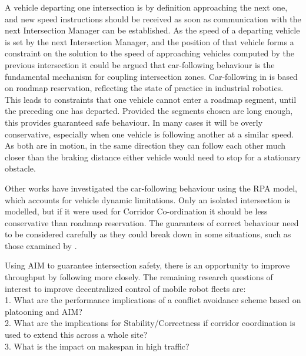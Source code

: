 \documentclass[runningheads]{llncs}
\begin{document}
A vehicle departing one intersection is by definition approaching the next one, and new speed instructions should be received as soon as communication with the next Intersection Manager can be established. As the speed of a departing vehicle is set by the next Intersection Manager, and the position of that vehicle forms a constraint on the solution to the speed of approaching vehicles computed by the previous intersection it could be argued that car-following behaviour is the fundamental mechanism for coupling intersection zones. Car-following in \cite{Digani2019} is based on roadmap reservation, reflecting the state of practice in industrial robotics. This leads to constraints that one vehicle cannot enter a roadmap segment, until the preceding one has departed. Provided the segments chosen are long enough, this provides guaranteed safe behaviour. In many cases it will be overly conservative, especially when one vehicle is following another at a similar speed. As both are in motion, in the same direction they can follow each other much closer than the braking distance either vehicle would need to stop for a stationary obstacle.

Other works have investigated the car-following behaviour \cite{Bichiou2019} using the RPA model, which accounts for vehicle dynamic limitations. Only an isolated intersection is modelled, but if it were used for Corridor Co-ordination it should be less conservative than roadmap reservation. The guarantees of correct behaviour need to be considered carefully as they could break down in some situations, such as those examined by \cite{Du2020}.


Using AIM to guarantee intersection safety, there is an opportunity to improve throughput by following more closely. The remaining research questions of interest to improve decentralized control of mobile robot fleets are:\\
1.  What are the performance implications of a conflict avoidance scheme based on platooning and AIM? \\
2. What are the implications for Stability/Correctness if corridor coordination is used to extend this across a whole site? \\
3.  What is the impact on makespan in high traffic?\\
\end{document}

